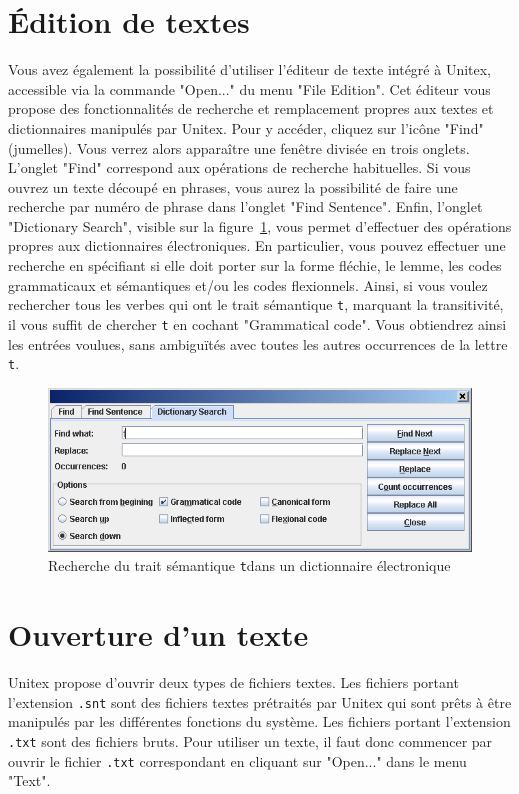 \section{Édition de textes}
Vous avez également la possibilité d’utiliser l’éditeur de texte intégré à Unitex, accessible
via la commande "Open..." du menu "File Edition". Cet éditeur vous propose des fonctionnalités
de recherche et remplacement propres aux textes et dictionnaires manipulés par Unitex. Pour y
accéder, cliquez sur l’icône "Find" (jumelles). Vous verrez alors apparaître une fenêtre divisée en
trois onglets. L’onglet "Find" correspond aux opérations de recherche habituelles. Si vous ouvrez un
texte découpé en phrases, vous aurez la possibilité de faire une recherche par numéro de phrase dans
l’onglet "Find Sentence". Enfin, l’onglet "Dictionary Search", visible sur la
figure~\ref{dictionary-search}, vous permet d’effectuer des opérations propres aux dictionnaires
électroniques. En particulier, vous pouvez effectuer une recherche en spécifiant si elle doit porter
sur la forme fléchie, le lemme, les codes grammaticaux et sémantiques et/ou les codes flexionnels.
Ainsi, si vous voulez rechercher tous les verbes qui ont le trait sémantique
\verb$t$, marquant la transitivité, il vous suffit de chercher \verb$t$ en cochant
"Grammatical code". Vous obtiendrez ainsi les entrées voulues, sans ambiguïtés avec toutes les
autres occurrences de la lettre \verb$t$.


\begin{figure}[!h]
\begin{center}
\includegraphics[width=15cm]{resources/img/fig2-6.png}
\caption{Recherche du trait sémantique \texttt{t}dans un dictionnaire
électronique\label{dictionary-search}}
\end{center}
\end{figure}


\section{Ouverture d’un texte}
\noindent Unitex propose d’ouvrir deux types de fichiers textes. 
Les fichiers portant l’extension \verb+.snt+ sont des fichiers textes prétraités 
par Unitex qui sont prêts à être manipulés par les différentes fonctions du système.
Les fichiers portant l’extension \verb+.txt+ sont des fichiers bruts.
Pour utiliser un texte, il faut donc commencer par ouvrir le fichier  \verb+.txt+
correspondant en cliquant sur "Open..." dans le menu "Text".


